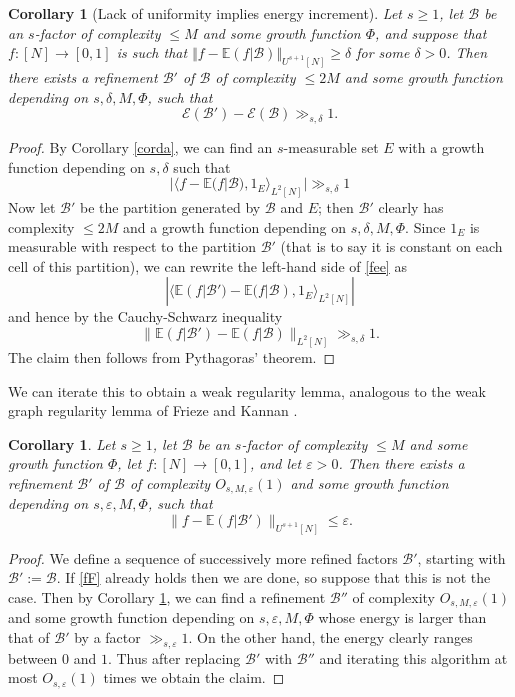 \documentclass[11pt,reqno]{amsart}
\numberwithin{equation}{section}
\theoremstyle{plain}
\newtheorem{corollary}[subsection]{Corollary}
\theoremstyle{definition}
\renewcommand{\leq}{\leqslant}
\renewcommand{\geq}{\geqslant}
\newcommand\E{{\mathbb{E}}}
\newcommand\B{\mathcal{B}}
\newcommand\1{{\bf 1}}
\newcommand\2{{\bf 2}}
\newcommand\eps{\varepsilon}
\begin{document}
\begin{corollary}[Lack of uniformity implies energy increment]\label{energy-inc}  
Let $s \geq 1$, let $\B$ be an $s$-factor of complexity $\leq M$ and some growth function $\Phi$, and suppose that $f : [N] \rightarrow [0,1]$ is such that $\Vert f - \E(f|\B) \Vert_{U^{s+1}[N]} \geq \delta$ for some $\delta>0$.   Then there exists a refinement $\B'$ of $\B$ of complexity $\leq 2M$ and some growth function depending on $s,\delta,M,\Phi$, such that
$$ {\mathcal E}(\B') - {\mathcal E}(\B) \gg_{s,\delta} 1.$$
\end{corollary}

\begin{proof}  By Corollary \ref{corda}, we can find an $s$-measurable set $E$ with a growth function depending on $s,\delta$ such that
\begin{equation}\label{fee}
|\langle f - \E(f|\B), 1_E \rangle_{L^2[N]}| \gg_{s,\delta} 1
\end{equation}
Now let $\B'$ be the partition generated by $\B$ and $E$; then $\B'$ clearly has complexity $\leq 2M$ and a growth function depending on $s,\delta,M,\Phi$.  Since $1_E$ is measurable with respect to the partition $\B'$ (that is to say it is constant on each cell of this partition), we can rewrite the left-hand side of \eqref{fee} as
$$ |\langle \E(f|\B') - \E(f|\B), 1_E \rangle_{L^2[N]}|$$
and hence by the Cauchy-Schwarz inequality
$$ \| \E(f|\B') - \E(f|\B) \|_{L^2[N]} \gg_{s,\delta} 1.$$
The claim then follows from Pythagoras' theorem.
\end{proof}

We can iterate this to obtain a weak regularity lemma, analogous to the weak graph regularity lemma of Frieze and Kannan \cite{frieze}.

\begin{corollary}\label{weak-reg}  
Let $s \geq 1$, let $\B$ be an $s$-factor of complexity $\leq M$ and some growth function $\Phi$, let $f : [N] \rightarrow [0,1]$, and let $\eps > 0$.  Then there exists a refinement $\B'$ of $\B$ of complexity $O_{s,M,\eps}(1)$ and some growth function depending on $s,\eps,M,\Phi$, such that
\begin{equation}\label{fF}
\| f - \E(f|\B') \|_{U^{s+1}[N]} \leq \eps.
\end{equation}
\end{corollary}
\begin{proof} We define a sequence of successively more refined factors $\B'$, starting with $\B' := \B$.  If \eqref{fF} already holds then we are done, so suppose that this is not the case.  Then by Corollary \ref{energy-inc}, we can find a refinement $\B''$ of complexity $O_{s,M,\eps}(1)$ and some growth function depending on $s,\eps,M,\Phi$ whose energy is larger than that of $\B'$ by a factor $\gg_{s,\eps} 1$.  On the other hand, the energy clearly ranges between $0$ and $1$.  Thus after replacing $\B'$ with $\B''$ and iterating this algorithm at most $O_{s,\eps}(1)$ times we obtain the claim.
\end{proof}
\end{document}
